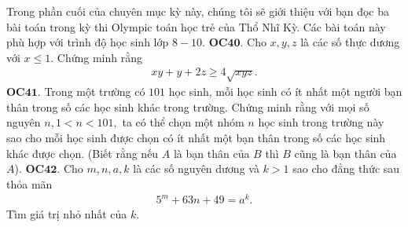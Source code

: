 \begin{multicols}{2}
\begin{figure}[H]
		\vspace*{-10pt}
	\end{figure}
	Trong phần cuối của chuyên mục kỳ này, chúng tôi sẽ giới thiệu với bạn đọc ba bài toán trong kỳ thi Olympic toán học trẻ  của Thổ Nhĩ Kỳ. Các bài toán này phù hợp với trình độ học sinh lớp $8-10$.
	\vskip 0.1cm
	{\bf\color{cackithi}OC$\pmb{40.}$} Cho $x, y, z$ là các số thực dương với $x\le 1.$ Chứng minh rằng
	\begin{align*}
		xy+y+2z \geq 4 \sqrt{xyz}.
	\end{align*}
	{\bf\color{cackithi}OC$\pmb{41.}$} Trong một trường có $101$ học sinh, mỗi học sinh có ít nhất một người bạn thân trong số các học sinh khác trong trường. Chứng minh rằng với mọi số nguyên $n, 1<n<101,$ ta có thể chọn một nhóm $n$ học sinh trong trường này sao cho mỗi học sinh được chọn có ít nhất một bạn thân trong số các học sinh khác được chọn. (Biết rằng nếu  $A$ là bạn thân của $B$ thì $B$ cũng là bạn thân của $A$).
	\vskip 0.1cm
	{\bf\color{cackithi} OC$\pmb{42.}$} Cho $m, n, a, k$ là các số nguyên dương và $k>1$ sao cho đẳng thức sau thỏa mãn 
	\begin{align*}
		5^m+63n+49=a^k.
	\end{align*} Tìm giá trị nhỏ nhất của $k$.
\end{multicols}
